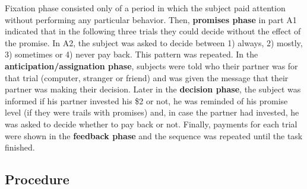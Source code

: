 \documentclass[12pt,]{article}
\begin{document}
Fixation phase consisted only of a period in which the subject paid
attention without performing any particular behavior. Then,
\textbf{promises phase} in part A1 indicated that in the following three
trials they could decide without the effect of the promise. In A2, the
subject was asked to decide between 1) always, 2) mostly, 3) sometimes
or 4) never pay back. This pattern was repeated. In the
\textbf{anticipation/assignation phase}, subjects were told who their
partner was for that trial (computer, stranger or friend) and was given
the message that their partner was making their decision. Later in the
\textbf{decision phase}, the subject was informed if his partner
invested his \$2 or not, he was reminded of his promise level (if they
were trails with promises) and, in case the partner had invested, he was
asked to decide whether to pay back or not. Finally, payments for each
trial were shown in the \textbf{feedback phase} and the sequence was
repeated until the task finished.

\hypertarget{procedure}{%
\subsection{Procedure}\label{procedure}}
\end{document}
